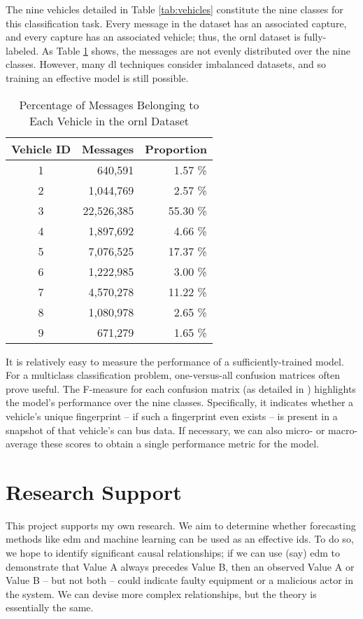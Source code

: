 \documentclass[11pt]{article}
\begin{document}
The nine vehicles detailed in Table \ref{tab:vehicles} constitute the nine classes for this classification task. Every message in the dataset has an associated capture, and every capture has an associated vehicle; thus, the \ac{ornl} dataset is fully-labeled. As Table \ref{tab:class-balance} shows, the messages are not evenly distributed over the nine classes. However, many \ac{dl} techniques consider imbalanced datasets, and so training an effective model is still possible.

\begin{table}
    \caption{Percentage of Messages Belonging to Each Vehicle in the \ac{ornl} Dataset}
    \centering
    \label{tab:class-balance}
    \begin{tabular}{|c|r|r|}
    \hline
    \textbf{Vehicle ID} & \textbf{Messages} & \textbf{Proportion} \\
    \hline
    1 & 640,591    & 1.57  \% \\
    2 & 1,044,769  & 2.57  \% \\
    3 & 22,526,385 & 55.30 \% \\
    4 & 1,897,692  & 4.66  \% \\
    5 & 7,076,525  & 17.37 \% \\
    6 & 1,222,985  & 3.00  \% \\
    7 & 4,570,278  & 11.22 \% \\
    8 & 1,080,978  & 2.65  \% \\
    9 & 671,279    & 1.65  \% \\
    \hline
    \end{tabular}
\end{table}

It is relatively easy to measure the performance of a sufficiently-trained model. For a multiclass classification problem, one-versus-all confusion matrices often prove useful. The F-measure for each confusion matrix (as detailed in \cite{James2014}) highlights the model's performance over the nine classes. Specifically, it indicates whether a vehicle's unique fingerprint -- if such a fingerprint even exists -- is present in a snapshot of that vehicle's \ac{can} bus data. If necessary, we can also micro- or macro-average these scores to obtain a single performance metric for the model.

\section{Research Support}

This project supports my own research. We aim to determine whether forecasting methods like \ac{edm} and machine learning can be used as an effective \ac{ids}. To do so, we hope to identify significant causal relationships; if we can use (say) \ac{edm} to demonstrate that Value A always precedes Value B, then an observed Value A or Value B – but not both – could indicate faulty equipment or a malicious actor in the system. We can devise more complex relationships, but the theory is essentially the same.
\end{document}
